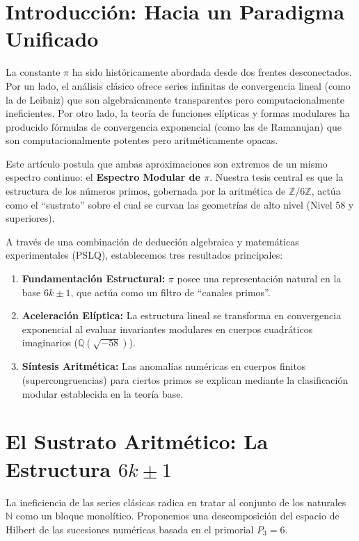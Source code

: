 \documentclass{article}
\theoremstyle{plain}
\theoremstyle{definition}
\theoremstyle{remark}
\numberwithin{equation}{section}
\begin{document}
\section{Introducción: Hacia un Paradigma Unificado}

La constante $\pi$ ha sido históricamente abordada desde dos frentes desconectados. Por un lado, el análisis clásico ofrece series infinitas de convergencia lineal (como la de Leibniz) que son algebraicamente transparentes pero computacionalmente ineficientes. Por otro lado, la teoría de funciones elípticas y formas modulares ha producido fórmulas de convergencia exponencial (como las de Ramanujan) que son computacionalmente potentes pero aritméticamente opacas.

Este artículo postula que ambas aproximaciones son extremos de un mismo espectro continuo: el \textbf{Espectro Modular de $\pi$}. Nuestra tesis central es que la estructura de los números primos, gobernada por la aritmética de $\mathbb{Z}/6\mathbb{Z}$, actúa como el ``sustrato'' sobre el cual se curvan las geometrías de alto nivel (Nivel 58 y superiores).

A través de una combinación de deducción algebraica y matemáticas experimentales (PSLQ), establecemos tres resultados principales:
\begin{enumerate}
    \item \textbf{Fundamentación Estructural:} $\pi$ posee una representación natural en la base $6k \pm 1$, que actúa como un filtro de ``canales primos''.
    \item \textbf{Aceleración Elíptica:} La estructura lineal se transforma en convergencia exponencial al evaluar invariantes modulares en cuerpos cuadráticos imaginarios ($\mathbb{Q}(\sqrt{-58})$).
    \item \textbf{Síntesis Aritmética:} Las anomalías numéricas en cuerpos finitos (supercongruencias) para ciertos primos se explican mediante la clasificación modular establecida en la teoría base.
\end{enumerate}

\section{El Sustrato Aritmético: La Estructura $6k \pm 1$}
\label{sec:sustrato}
La ineficiencia de las series clásicas radica en tratar al conjunto de los naturales $\mathbb{N}$ como un bloque monolítico. Proponemos una descomposición del espacio de Hilbert de las sucesiones numéricas basada en el primorial $P_3 = 6$.
\end{document}
